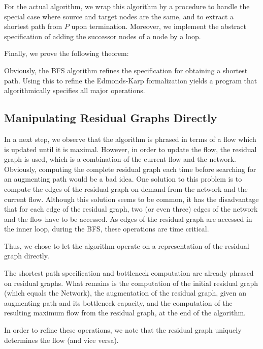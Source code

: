 \documentclass{llncs}
\begin{document}
  For the actual algorithm, we wrap this algorithm by a procedure to handle the special case where source and target nodes are the same, and to extract a shortest path 
  from $P$ upon termination. Moreover, we implement the abstract specification of adding the successor nodes of a node by a loop.
  
  Finally, we prove the following theorem: %
  
  Obviously, the BFS algorithm refines the specification for obtaining a shortest path.
  Using this to refine the Edmonds-Karp formalization yields a program that algorithmically specifies all major operations.
    
  \subsection{Manipulating Residual Graphs Directly}\label{sec:impl_res_graph}
  In a next step, we observe that the algorithm is phrased in terms of a flow which is updated until it is maximal. However,
  in order to update the flow, the residual graph is used, which is a combination of the current flow and the network.
  Obviously, computing the complete residual graph each time before searching for an augmenting path would be a bad idea. 
  One solution to this problem is to compute the edges of the residual graph on demand from the network and the current flow.
  Although this solution seems to be common, it has the disadvantage that for each edge of the residual graph, two (or even three) 
  edges of the network and the flow have to be accessed. As edges of the residual graph are accessed in the inner loop, during 
  the BFS, these operations are time critical.
  
  Thus, we chose to let the algorithm operate on a representation of the residual graph directly.
  
  The shortest path specification and bottleneck computation are already 
  phrased on residual graphs. What remains is the computation of the initial residual graph (which equals the Network),
  the augmentation of the residual graph, given an augmenting path and its bottleneck capacity, and the computation of the 
  resulting maximum flow from the residual graph, at the end of the algorithm.
  
  In order to refine these operations, we note that the residual graph uniquely determines the flow (and vice versa). 
\end{document}

